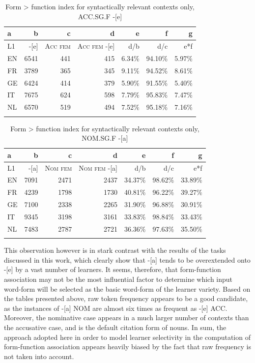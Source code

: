 \begin{table}
    \begin{tabularx}{\textwidth}{X>{\columncolor{lsDOIGray}}rrr >{\columncolor{lsDOIGray}}rr>{\columncolor{lsDOIGray}}r}
        \lsptoprule
        a & b & c & d & e & f & g\\
        \midrule
        L1 & {}-[e] & \textsc{Acc} \textsc{fem} & \textsc{Acc} \textsc{fem} -[e] & d/b & d/c & e*f\\
        EN & 6541 & 441 & 415 & 6.34\% & 94.10\% & 5.97\%\\
        FR & 3789 & 365 & 345 & 9.11\% & 94.52\% & 8.61\%\\
        GE & 6424 & 414 & 379 & 5.90\% & 91.55\% & 5.40\%\\
        IT & 7675 & 624 & 598 & 7.79\% & 95.83\% & 7.47\%\\
        NL & 6570 & 519 & 494 & 7.52\% & 95.18\% & 7.16\%\\
        \lspbottomrule
    \end{tabularx}
    \caption{Form > function index for syntactically relevant contexts only, ACC.SG.F -[e]}
    \label{tab:08:1}
\end{table}

\begin{table}
    \begin{tabularx}{\textwidth}{Xrrr rrr}
        \lsptoprule
        a & b & c & d & e & f & g\\
        \midrule
        L1 & {}-[a] & \textsc{Nom} \textsc{fem} & \textsc{Nom} \textsc{fem} -[a] & d/b & d/c & e*f\\
        EN & 7091 & 2471 & 2437 & 34.37\% & 98.62\% & 33.89\%\\
        FR & 4239 & 1798 & 1730 & 40.81\% & 96.22\% & 39.27\%\\
        GE & 7100 & 2338 & 2265 & 31.90\% & 96.88\% & 30.91\%\\
        IT & 9345 & 3198 & 3161 & 33.83\% & 98.84\% & 33.43\%\\
        NL & 7483 & 2787 & 2721 & 36.36\% & 97.63\% & 35.50\%\\
        \lspbottomrule
    \end{tabularx}
    \caption{Form > function index for syntactically relevant contexts only, NOM.SG.F -[a]}
    \label{tab:08:2}
\end{table}

This observation however is in stark contrast with the results of the tasks discussed in this work, which clearly show that -[a] tends to be overextended onto -[e] by a vast number of learners. It seems, therefore, that form-function association may not be the most influential factor to determine which input word-form will be selected as the basic word-form of the learner variety. Based on the tables presented above, raw token frequency appears to be a good candidate, as the instances of -[a] NOM are almost six times as frequent as -[e] ACC. Moreover, the nominative case appears in a much larger number of contexts than the accusative case, and is the default citation form of nouns. In sum, the approach adopted here in order to model learner selectivity in the computation of form-function association appears heavily biased by the fact that raw frequency is not taken into account.

